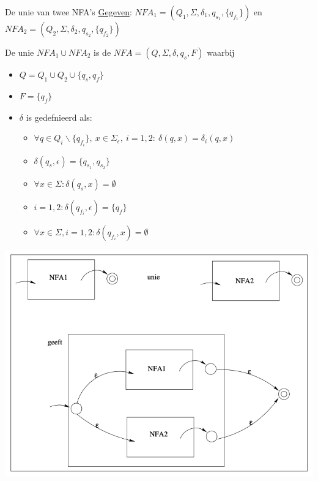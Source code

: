 \begin{pro}{De unie van twee NFA's}
    \underline{Gegeven}: ${NFA}_1 = (Q_1,\Sigma, \delta_1, q_{s_1}, \{q_{f_1}\})$ en ${NFA}_2 = (Q_2,\Sigma, \delta_2, q_{s_2}, \{q_{f_2}\})$ \\

    \begin{minipage}{.63\textwidth}
        De unie ${NFA}_1 \cup {NFA}_2$ is de $NFA = (Q,\Sigma, \delta, q_s, F)$ waarbij

        \begin{itemize}
            \item $Q = Q_1 \cup Q_2 \cup \{ q_s, q_f \}$
            \item $F = \{q_f\}$
            \item $\delta$ is gedefnieerd als:
            \begin{itemize}
                \item $\forall q \in Q_{i} \backslash \{q_{f_{i}}\}, \ x \in \Sigma_{\epsilon}, \ i = 1,2: \ \delta(q,x) = \delta_i(q,x)$
                \item $\delta(q_s, \epsilon) = \{q_{s_{1}}, q_{s_{2}}\}$
                \item $\forall x \in \Sigma: \delta(q_s, x) = \emptyset$
                \item $i = 1,2: \delta(q_{f_{i}}, \epsilon) = \{q_f\}$
                \item $\forall x \in \Sigma, i = 1,2: \delta(q_{f_{i}}, x) = \emptyset$
            \end{itemize}
        \end{itemize}
    \end{minipage}
    \begin{minipage}{.33\textwidth}
        \includegraphics[scale = 0.225]{Images/UnieNFA}
    \end{minipage}
\end{pro}

